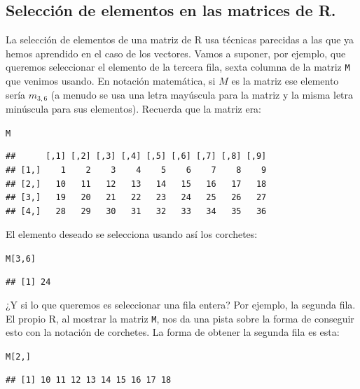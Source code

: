 \documentclass[10pt,a4paper]{article}\usepackage[]{graphicx}\usepackage[]{color}
\makeatletter
\newcommand{\hlnum}[1]{\textcolor[rgb]{0.686,0.059,0.569}{#1}}%
\newcommand{\hlstd}[1]{\textcolor[rgb]{0.345,0.345,0.345}{#1}}%
\newenvironment{kframe}{%
 \def\at@end@of@kframe{}%
 \ifinner\ifhmode%
  \def\at@end@of@kframe{\end{minipage}}%
  \begin{minipage}{\columnwidth}%
 \fi\fi%
 \def\FrameCommand##1{\hskip\@totalleftmargin \hskip-\fboxsep
 \colorbox{shadecolor}{##1}\hskip-\fboxsep
     \hskip-\linewidth \hskip-\@totalleftmargin \hskip\columnwidth}%
 \MakeFramed {\advance\hsize-\width
   \@totalleftmargin\z@ \linewidth\hsize
   \@setminipage}}%
 {\par\unskip\endMakeFramed%
 \at@end@of@kframe}
\newenvironment{knitrout}{}{} %
\makeatother
\begin{document}
\subsection{Selección de elementos en las matrices de R.}
\label{tut03:subsec:SeleccionElementosMatrices}


La selección de elementos de una matriz de R usa técnicas parecidas a las que ya hemos aprendido en el caso de los vectores. Vamos a suponer, por ejemplo, que queremos seleccionar el elemento de la tercera fila, sexta columna de la matriz {\tt M} que venimos usando. En notación matemática, si $M$ es la matriz ese elemento sería $m_{3,6}$ (a menudo se usa una letra mayúscula para la matriz y la misma letra minúscula para sus elementos). Recuerda que la matriz era:
\begin{knitrout}
\color{fgcolor}\begin{kframe}
\begin{alltt}
\hlstd{M}
\end{alltt}
\begin{verbatim}
##      [,1] [,2] [,3] [,4] [,5] [,6] [,7] [,8] [,9]
## [1,]    1    2    3    4    5    6    7    8    9
## [2,]   10   11   12   13   14   15   16   17   18
## [3,]   19   20   21   22   23   24   25   26   27
## [4,]   28   29   30   31   32   33   34   35   36
\end{verbatim}
\end{kframe}
\end{knitrout}
     El elemento deseado se selecciona usando así los corchetes:
\begin{knitrout}
\color{fgcolor}\begin{kframe}
\begin{alltt}
\hlstd{M[}\hlnum{3}\hlstd{,} \hlnum{6}\hlstd{]}
\end{alltt}
\begin{verbatim}
## [1] 24
\end{verbatim}
\end{kframe}
\end{knitrout}
     ¿Y si lo que queremos es seleccionar una fila entera? Por ejemplo, la segunda fila. El propio R, al mostrar la matriz {\tt M}, nos da una pista sobre la forma de conseguir esto con la notación de corchetes. La forma de obtener la segunda fila es esta:
\begin{knitrout}
\color{fgcolor}\begin{kframe}
\begin{alltt}
\hlstd{M[}\hlnum{2}\hlstd{, ]}
\end{alltt}
\begin{verbatim}
## [1] 10 11 12 13 14 15 16 17 18
\end{verbatim}
\end{kframe}
\end{knitrout}
\end{document}
